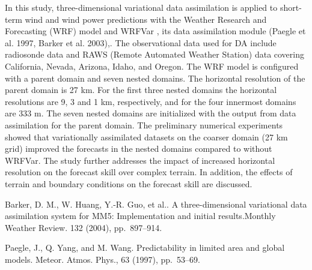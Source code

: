 In this study, three-dimensional variational data assimilation is applied to short-term wind and wind power predictions with the Weather Research and Forecasting (WRF) model and WRFVar , its data assimilation module (Paegle et al. 1997, Barker et al. 2003),. The observational data used for DA include radiosonde data and RAWS (Remote Automated Weather Station) data covering California, Nevada, Arizona, Idaho, and Oregon. The WRF model is configured with a parent domain and seven nested domains. The horizontal resolution of the parent domain is 27 km. For the first three nested domains the horizontal resolutions are 9, 3 and 1 km, respectively, and for the four innermost domains are 333 m. The seven nested domains are initialized with the output from data assimilation for the parent domain. The preliminary numerical experiments showed that variationally assimilated datasets on the coarser domain (27 km grid) improved the forecasts in the nested domains compared to without WRFVar. The study further addresses the impact of increased horizontal resolution on the forecast skill over complex terrain. In addition, the effects of terrain and boundary conditions on the forecast skill are discussed.


\begin{thebibliography}{10}
{\sc Barker, D. M., W. Huang, Y.-R. Guo, et al.}. {A three-dimensional variational data assimilation system for MM5: Implementation and initial results}.Monthly Weather Review. 132 (2004), pp.~897--914.

{\sc Paegle, J., Q. Yang, and M. Wang}. {Predictability in limited area and global models}. Meteor. Atmos. Phys., 63 (1997), pp.~53--69.
\end{thebibliography}
